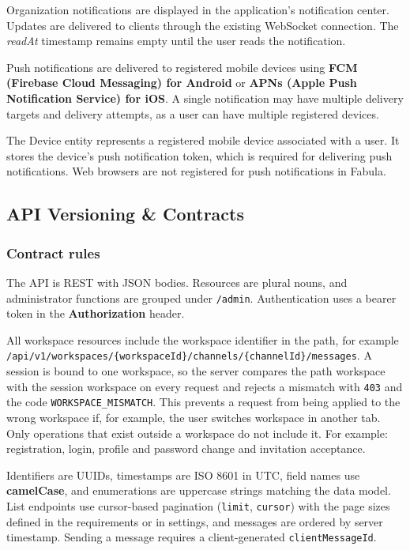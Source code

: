 \documentclass[
    english, %
]{VUMIFPSkursinis}
\begin{document}
Organization notifications are displayed in the application's notification center. Updates are delivered to clients through the existing WebSocket connection. The \textit{readAt} timestamp remains empty until the user reads the notification.

Push notifications are delivered to registered mobile devices using \textbf{FCM (Firebase Cloud Messaging) for Android} or \textbf{APNs (Apple Push Notification Service) for iOS}. A single notification may have multiple delivery targets and delivery attempts, as a user can have multiple registered devices.

The Device entity represents a registered mobile device associated with a user. It stores the device's push notification token, which is required for delivering push notifications. Web browsers are not registered for push notifications in Fabula.

\subsection{API Versioning \& Contracts}

\subsubsection{Contract rules}
The API is REST with JSON bodies. Resources are plural nouns, and administrator functions are grouped under \texttt{/admin}. Authentication uses a bearer token in the \textbf{Authorization} header.

All workspace resources include the workspace identifier in the path, for example \texttt{/api/v1/workspaces/\{workspaceId\}/channels/\{channelId\}/messages}. A session is bound to one workspace, so the server compares the path workspace with the session workspace on every request and rejects a mismatch with \texttt{403} and the code \texttt{WORKSPACE\_MISMATCH}. This prevents a request from being applied to the wrong workspace if, for example, the user switches workspace in another tab. Only operations that exist outside a workspace do not include it. For example: registration, login, profile and password change and invitation acceptance.

Identifiers are UUIDs, timestamps are ISO 8601 in UTC, field names use \textbf{camelCase}, and enumerations are uppercase strings matching the data model. List endpoints use cursor-based pagination (\texttt{limit}, \texttt{cursor}) with the page sizes defined in the requirements or in settings, and messages are ordered by server timestamp. Sending a message requires a client-generated \texttt{clientMessageId}.
\end{document}
